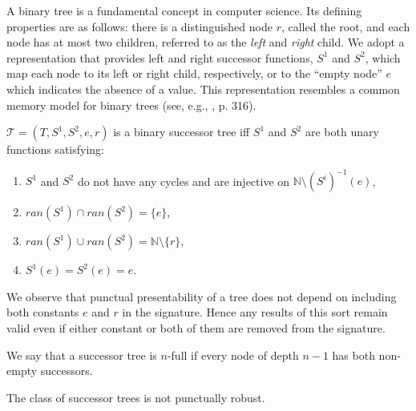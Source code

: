 \documentclass[a4paper,UKenglish,cleveref, autoref, thm-restate]{lipics-v2021}
\begin{document}
A binary tree is a fundamental concept in computer science. Its defining properties are as follows: there is a distinguished node $r$, called the root, and each node has at most two children, referred to as the \emph{left} and \emph{right} child. We adopt a representation that provides left and right successor functions, $S^1$ and $S^2$, which map each node to its left or right child, respectively, or to the “empty node” $e$ which indicates the absence of a value. This representation resembles a common memory model for binary trees (see, e.g., \cite{knuth_art_1968}, p. 316).
\begin{definition}
  $\mathcal{T}=(T,S^1,S^2,e,r)$ is a binary successor tree iff $S^1$ and $S^2$ are both unary functions satisfying:
  \begin{enumerate}
      \item $S^1$ and $S^2$ do not have any cycles and are injective on $\mathbb{N} \setminus (S^i)^{-1}(e)$,
      \item $ran(S^1) \cap ran(S^2) = \{e\}$,
      \item $ran(S^1) \cup ran(S^2) = \mathbb{N}\setminus \{r\}$,
      \item $S^1(e)=S^2(e)=e$.
  \end{enumerate}
\end{definition}

We observe that punctual presentability of a tree does not depend on including both constants $e$ and $r$ in the signature. Hence any results of this sort remain valid even if either constant or both of them are removed from the signature.

\begin{definition}
   We say that a successor tree is $n$-full if every node of depth $n-1$ has both non-empty successors.
\end{definition}



\begin{theorem}
    The class of successor trees is not punctually robust.
\end{theorem}
\end{document}
